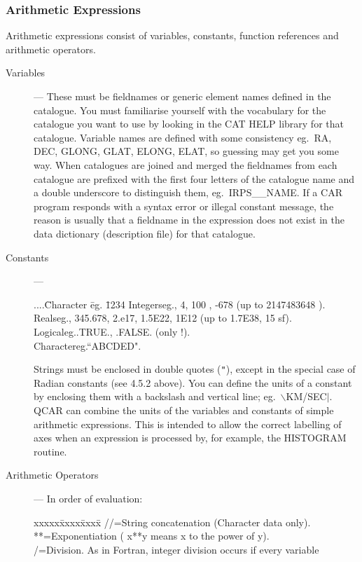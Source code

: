 \subsubsection {Arithmetic Expressions}
Arithmetic expressions consist of variables, constants, function references and
arithmetic operators.
\begin{description}
\item [Variables] ---
These must be fieldnames or generic element names defined in the catalogue.
You must familiarise yourself with the vocabulary for the catalogue you want to
use by looking in the CAT HELP library for that catalogue.
Variable names are defined with some consistency eg.\  RA, DEC, GLONG, GLAT,
ELONG, ELAT, so guessing may get you some way.
When catalogues are joined and merged the fieldnames from each catalogue are
prefixed with the first four letters of the catalogue name and a double
underscore to distinguish them, eg.\  IRPS\_\_NAME.
If a CAR program responds with a syntax error or illegal constant message, the
reason is usually that a fieldname in the expression does not exist in the data
dictionary (description file) for that catalogue.
\item [Constants] ---
\begin{tabbing}
....\=Character \=eg. \=1234\kill
\>Integers\>eg., 4, 100 , -678  (up to 2147483648 ).\\
\>Reals\>eg., 345.678, 2.e17, 1.5E22, 1E12 (up to 1.7E38, 15 sf).\\
\>Logical\>eg.\>.TRUE., .FALSE. (only !).\\
\>Character\>eg.\>``ABCDED".
\end{tabbing}
Strings must be enclosed in double quotes ({\tt "}), except in the special case
of Radian constants (see 4.5.2 above).
You can define the units of a constant by enclosing them with a backslash and
vertical line; eg.\  $\backslash$KM/SEC$|$.
QCAR can combine the units of the variables and constants of simple arithmetic
expressions.
This is intended to allow the correct labelling of axes when an expression is
processed by, for example, the HISTOGRAM routine.
\item [Arithmetic Operators] ---
In order of evaluation:
\begin{tabbing}
xxxxx\=xxxx\=xxx\=x\kill
\>//\>=\>String concatenation (Character data only).\\
\>**\>=\>Exponentiation ( x**y means x to the power of y).\\
\>/\>=\>Division.  As in Fortran, integer division occurs if every variable\\

\end{tabbing}
\end{description}
